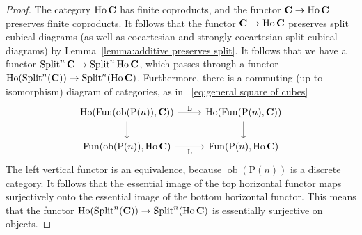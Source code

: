 \documentclass[psamsfonts]{amsart}
\theoremstyle{plain}
\theoremstyle{definition}
\theoremstyle{remark}
\newcommand{\catname}[1]{{\normalfont\textbf{#1}}}
\newcommand{\ob}{\operatorname{ob}}
\newcommand{\lkan}{\mathrm{L}}
\newcommand{\power}{\mathrm{P}}
\DeclareMathOperator{\fun}{Fun}
\DeclareMathOperator{\splitcube}{Split}
\DeclareMathOperator{\ho}{Ho}
\begin{document}
\begin{proof}
The category $\ho\catname{C}$ has finite coproducts, and the functor $\catname{C}\to \ho\catname{C}$ preserves finite coproducts. 
It follows that the functor $\catname{C}\to \ho\catname{C}$ preserves split cubical diagrams (as well as cocartesian and strongly cocartesian split cubical diagrams) by Lemma~\ref{lemma:additive preserves split}. 
It follows that we have a functor $\splitcube^n{\catname{C}}\to \splitcube^n{\ho\catname{C}}$, which passes through a functor $\ho(\splitcube^n(\catname{C}))\to \splitcube^n(\ho\catname{C})$. Furthermore, there is a commuting (up to isomorphism)
diagram of categories, as in ~\eqref{eq:general square of cubes}
\[
\begin{tikzcd}
	\ho(\fun(\ob(\power(n)), \catname{C})) & \ho(\fun(\power(n), \catname{C})) \\
	{\fun(\ob(\power(n)), \ho\catname{C})} & {\fun(\power(n), \ho\catname{C})}
	\arrow["\lkan", from=1-1, to=1-2]
	\arrow[ from=1-1, to=2-1]
	\arrow[ from=1-2, to=2-2]
	\arrow["\lkan"', from=2-1, to=2-2]
\end{tikzcd}
\]
The left vertical functor is an equivalence, because $\ob(\power(n))$ is a discrete category. It follows that the essential image of the top horizontal functor maps surjectively onto the essential image of the bottom horizontal functor. This means that the functor $\ho(\splitcube^n(\catname{C}))\to \splitcube^n(\ho\catname{C})$ is essentially surjective on objects. 


\end{proof}
\end{document}
